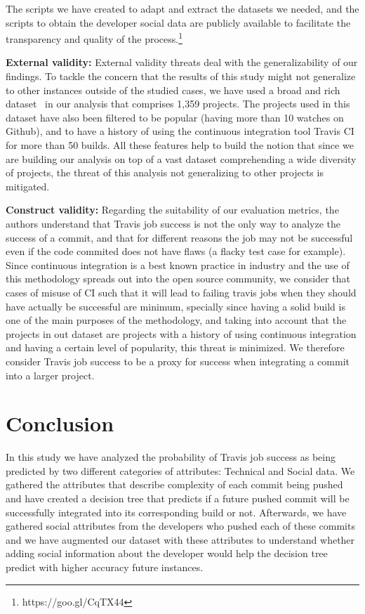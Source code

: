 \documentclass[10pt, conference]{IEEEtran}
\begin{document}
The scripts we have created to adapt and extract the datasets we needed, and the 
scripts to obtain the developer social data are publicly available to facilitate 
the transparency and quality of the process.\footnote{https://goo.gl/CqTX44}

\noindent\textbf{External validity:} 
External validity threats deal with the generalizability of our findings. 
To tackle the concern that the results of this study might not generalize to 
other instances outside of the studied cases, we have used a broad and rich 
dataset~\cite{msr17challenge} in our analysis that comprises 1,359 projects. The 
projects used in this dataset have also been filtered to be popular (having more 
than 10 watches on Github), and to have a history of using the continuous 
integration tool Travis CI for more than 50 builds. All these features help to 
build the notion that since we are building our analysis on top of a vast 
dataset comprehending a wide diversity of projects, the threat of this analysis 
not generalizing to other projects is mitigated.

\noindent\textbf{Construct validity:}
Regarding the suitability of our evaluation metrics, the authors understand that 
Travis job success is not the only way to analyze the success of a commit, and 
that for different reasons the job may not be successful even if the code 
commited does not have flaws (a flacky test case for example). Since continuous 
integration is a best known practice in industry and the use of this methodology 
spreads out into the open source community, we consider that cases of misuse of 
CI such that it will lead to failing travis jobs when they should have actually 
be successful are minimum, specially since having a solid build is one of the 
main purposes of the methodology, and taking into account that the projects in 
out dataset are projects with a history of using continuous integration and 
having a certain level of popularity, this threat is minimized. We therefore 
consider Travis job success to be a proxy 
for success when integrating a commit into a larger project.






\section{Conclusion}
In this study we have analyzed the probability of Travis job success as being predicted by two different categories of attributes: Technical and Social data.
We gathered the attributes that describe complexity of each commit being pushed and have created a decision tree that predicts if a future pushed commit will be successfully integrated into its corresponding build or not.
Afterwards, we have gathered social attributes from the developers who pushed each of these commits
and we have augmented our dataset with these attributes to understand whether adding social information about the developer would help the decision tree predict with higher accuracy future 
instances.
\end{document}
